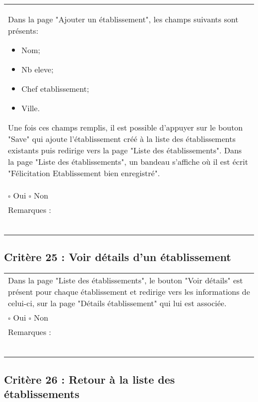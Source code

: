 	\begin{center}
    	 		\begin{tabular}[h]{|p{}|}
			\hline
				Dans la page "Ajouter un établissement", les champs suivants sont présents: 
				\begin{itemize}
					\item Nom;
					\item Nb eleve;
					\item Chef etablissement;
					\item Ville.
				\end{itemize}
				Une fois ces champs remplis, il est possible d'appuyer sur le bouton "Save" qui ajoute l'établissement créé à la liste des établissements existants puis redirige vers la page "Liste des établissements". Dans la page "Liste des établissements", un bandeau s'affiche où il est écrit "Félicitation Etablissement bien enregistré".\\
				$\square$ Oui  \hfill \hfill $\square$ Non \\\hline Remarques : \\ ~\\
			 \\\hline
     		\end{tabular}
  		\end{center}	
  		
  		
  		\subsection*{Critère 25 : Voir détails d'un établissement}
	
	\begin{center}
    	 		\begin{tabular}[h]{|p{}|}
			\hline
				Dans la page "Liste des établissements", le bouton "Voir détails" est présent pour chaque établissement et redirige vers les informations de celui-ci, sur la page "Détails établissement" qui lui est associée.\\
				$\square$ Oui  \hfill \hfill $\square$ Non \\\hline Remarques : \\ ~\\
			 \\\hline
     		\end{tabular}
  		\end{center}	
  		
  		
  		\subsection*{Critère 26 : Retour à la liste des établissements}
	
